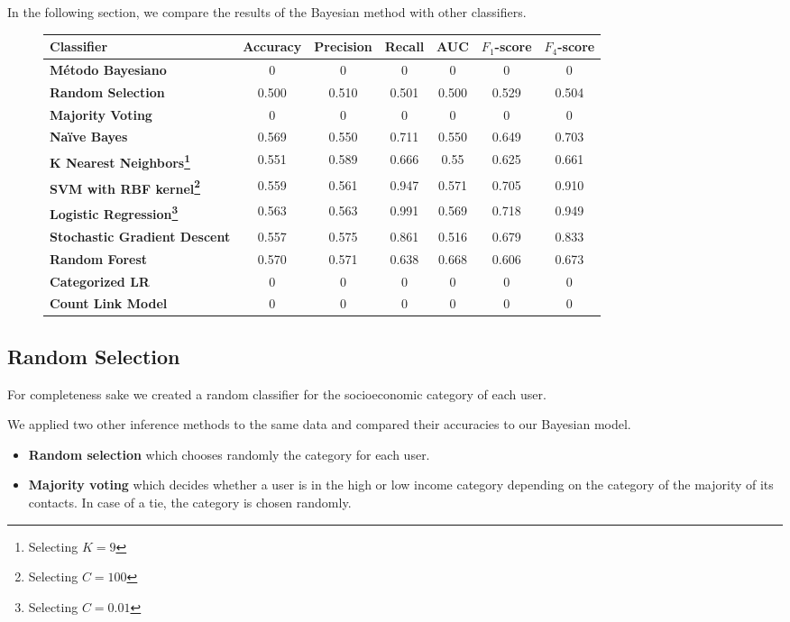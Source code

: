 \newcommand{\ypred}{y_{pred}}
\newcommand{\ytrue}{y_{true}}

In the following section, we compare the results of the Bayesian method with other classifiers.

\begin{figure}
	\begin{tabularx}{\textwidth}{>{\bfseries}X c c c c c c}
		\toprule
		\textbf{Classifier} & \textbf{Accuracy} & \textbf{Precision} & \textbf{Recall} & \textbf{AUC} & \textbf{$F_1$}-\textbf{score} & \textbf{$F_4$}-\textbf{score} \\
		\midrule
		Método Bayesiano & 0 & 0 & 0 & 0 & 0 & 0 \\
		\midrule
		Random Selection & 0.500 & 0.510 & 0.501 & 0.500 & 0.529 & 0.504 \\
		Majority Voting & 0 & 0 & 0 & 0 & 0 & 0 \\
		\midrule
		Naïve Bayes & 0.569 & 0.550 & 0.711 & 0.550 & 0.649 & 0.703 \\
		K Nearest Neighbors\footnote{Selecting $K = 9$} & 0.551 & 0.589 & 0.666 & 0.55 & 0.625 & 0.661 \\
		SVM with RBF kernel\footnote{Selecting $C = 100$} & 0.559 & 0.561 & 0.947 & 0.571 & 0.705 & 0.910 \\
		Logistic Regression\footnote{Selecting $C = 0.01$} & 0.563 & 0.563 & 0.991 & 0.569 & 0.718 & 0.949 \\
		Stochastic Gradient Descent & 0.557 & 0.575 & 0.861 & 0.516 & 0.679 & 0.833 \\
		Random Forest & 0.570 & 0.571 & 0.638 & 0.668 & 0.606 & 0.673 \\
		\midrule
		Categorized LR & 0 & 0 & 0 & 0 & 0 & 0 \\
		Count Link Model & 0 & 0 & 0 & 0 & 0 & 0 \\
		\bottomrule
	\end{tabularx}
\end{figure}

\subsection{Random Selection}

For completeness sake we created a random classifier for the socioeconomic category of each user.

We applied two other inference methods to the same data and compared their accuracies to our Bayesian model.

\begin{itemize}
	\item \textbf{Random selection} which chooses randomly the category for each user.
	\item \textbf{Majority voting} which decides whether a user is in the high or low income category depending on the category of the majority of its contacts. In case of a tie, the category is chosen randomly.
\end{itemize}

